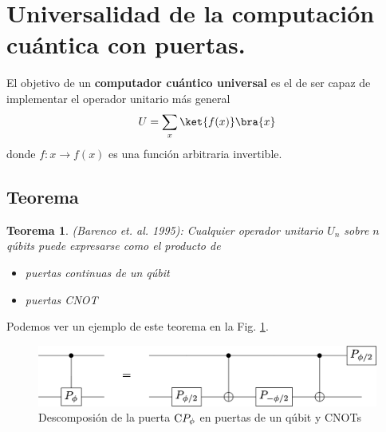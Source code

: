 \documentclass[a4paper,11pt]{book} %
\newtheorem{teorema_contador}{Teorema}
\newcommand{\Teorema}[1]{
		\begin{mybox_gray2}{}
			\begin{teorema_contador}
				 #1 
			\end{teorema_contador} 
		\end{mybox_gray2}
	}
\numberwithin{equation}{chapter}
\newcommand{\cg}[1]{{\rm C}#1}
\begin{document}
	\section{Universalidad de la computación cuántica con puertas.} \label{sec_elementos_universalidad}

El objetivo de un \textbf{computador cuántico universal} es el de ser capaz de implementar el operador unitario más general
	$$
	U  = \sum_x \ket{f(x)}\bra{x}
	$$
donde $f: x \to f(x)$ es una función arbitraria invertible.

    	\subsection{Teorema}



	\Teorema{ \textit{(Barenco et. al. 1995):} 
	Cualquier operador unitario $U_n$ sobre $n$ qúbits puede expresarse como el 
	producto de 
	\begin{itemize}
		\item puertas continuas de \textit{un qúbit}
		\item puertas CNOT
	\end{itemize}
	}

Podemos ver un ejemplo de este teorema en la Fig. \ref{Fig_elementos_Equiv_Phase}.
	\begin{figure}[H]
	\centering 
	\includegraphics[width=0.60\linewidth]{Figuras/Fig_elementos_Equiv_Phase}
	\caption{Descomposión de la puerta $\cg{P_\phi}$ en puertas de un qúbit y CNOTs}
	\label{Fig_elementos_Equiv_Phase}
	\end{figure}
\end{document}
